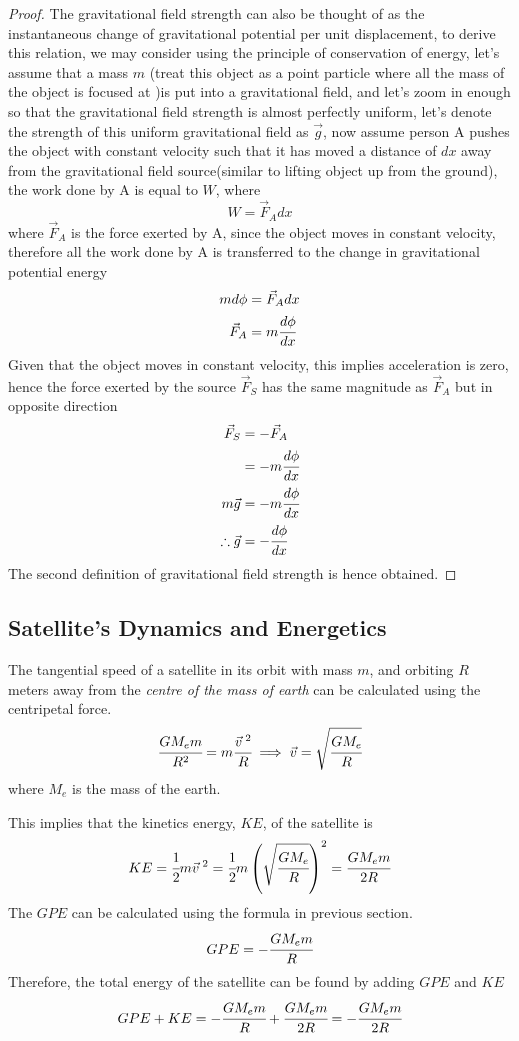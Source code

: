 \documentclass{article}
\begin{document}
\begin{proof}


The gravitational field strength can also be thought of as the instantaneous change of gravitational potential per unit displacement, to derive this relation, we may consider using the principle of conservation of energy, let's assume that a mass $m$ (treat this object as a point particle where all the mass of the object is focused at )is put into a gravitational field, and let's zoom in enough so that the gravitational field strength is almost perfectly uniform, let's denote the strength of this uniform gravitational field as $\vec{g}$, now assume person A pushes the object with constant velocity such that it has moved a distance of $dx$ away from the gravitational field source(similar to lifting object up from the ground), the work done by A is equal to $W$, where 
$$W=\vec{F}_Adx$$
where $\vec{F}_A$ is the force exerted by A, since the object moves in constant velocity, therefore all the work done by A is transferred to the change in gravitational potential energy
\begin{align*}
    md\phi&=\vec{F}_Adx\\ 
    \vec{F}_A&=m\cfrac{d\phi}{dx}
\end{align*}
Given that the object moves in constant velocity, this implies acceleration is zero, hence the force exerted by the source $\vec{F}_S$ has the same magnitude as $\vec{F}_A$ but in opposite direction
\begin{align*}
    \vec{F}_S&=-\vec{F}_A \\ 
            &=-m\cfrac{d\phi}{dx}\\ 
    m\vec{g}&=-m\cfrac{d\phi}{dx} \\ 
    \therefore \vec{g}&=-\cfrac{d\phi}{dx}
\end{align*}        
The second definition of gravitational field strength is hence obtained.
\end{proof}

 \subsection{Satellite's Dynamics and Energetics}


The tangential speed of a satellite in its orbit with mass $m$, and orbiting $R$ meters away from the \textit{centre of the mass of earth} can be calculated using the centripetal force.
    $$\cfrac{GM_em}{R^2}=m\cfrac{{\vec{v}}^{\; 2}}{R} \implies \vec{v}=\sqrt{\cfrac{GM_e}{R}}$$
where $M_e$ is the mass of the earth.\par This implies that the kinetics energy, $KE$, of the satellite is
$$KE=\cfrac{1}{2}m{\vec{v}}^{\; 2}=\cfrac{1}{2}m\left(\sqrt{\cfrac{GM_e}{R}}\right)^2=\cfrac{GM_em}{2R}$$
The $GPE$ can be calculated using the formula in previous section.
$$GPE=-\cfrac{GM_em}{R}$$
Therefore, the total energy of the satellite can be found by adding $GPE$ and $KE$
$$GPE+KE=-\cfrac{GM_em}{R}+\cfrac{GM_em}{2R}=-\cfrac{GM_em}{2R}$$
\end{document}
